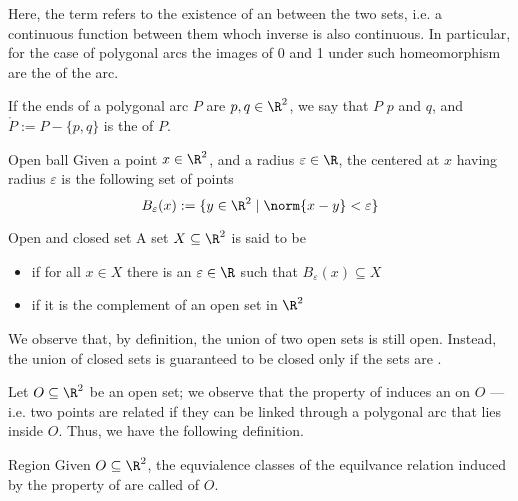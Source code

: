 \documentclass[a4paper, 12pt]{report}
\begin{document}
    Here, the term  refers to the existence of an  between the two sets, i.e. a continuous function between them whoch inverse is also continuous. In particular, for the case of polygonal arcs the images of 0 and 1 under such homeomorphism are the  of the arc.
    
    If the ends of a polygonal arc $P$ are $p, q \in \R^2$, we say that $P$  $p$ and $q$, and $\mathring P := P - \{p, q\}$ is the  of $P$.

    \begin{frameddefn}{Open ball}
        Given a point $x \in \R^2$, and a radius $\varepsilon \in \R$, the  centered at $x$ having radius $\varepsilon$ is the following set of points $$B_\varepsilon(x) := \{y \in \R^2 \mid \norm{x - y} < \varepsilon\}$$
    \end{frameddefn}

    \begin{frameddefn}{Open and closed set}
        A set $X \subseteq \R^2$ is said to be

        \begin{itemize}
            \item {} if for all $x \in X$ there is an $\varepsilon \in \R$ such that $B_\varepsilon(x) \subseteq X$
            \item {} if it is the complement of an open set in $\R^2$
        \end{itemize}
    \end{frameddefn}

    We observe that, by definition, the union of two open sets is still open. Instead, the union of closed sets is guaranteed to be closed only if the sets are .

    Let $O \subseteq \R^2$ be an open set; we observe that the property of  induces an  on $O$ --- i.e. two points are related if they can be linked through a polygonal arc that lies inside $O$. Thus, we have the following definition.

    \begin{frameddefn}{Region}
        Given $O \subseteq \R^2$, the equvialence classes of the equilvance relation induced by the property of  are called  of $O$.
    \end{frameddefn}
\end{document}
